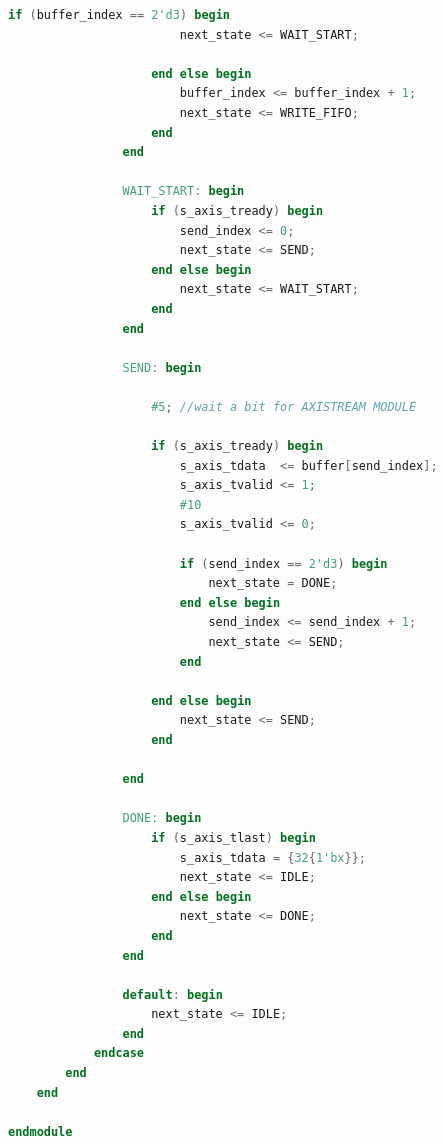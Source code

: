 \begin{adjustwidth}{1.5cm}{}
\begin{lstlisting}[language=verilog,frame=single,caption={Código fuente de la cola FIFO conversora a AXI-Stream},showstringspaces=false,label=lst:verilogFifo2axis]
                    if (buffer_index == 2'd3) begin
                        next_state <= WAIT_START;
                        
                    end else begin
                        buffer_index <= buffer_index + 1;
                        next_state <= WRITE_FIFO;
                    end
                end

                WAIT_START: begin
                    if (s_axis_tready) begin
                        send_index <= 0;
                        next_state <= SEND;
                    end else begin
                        next_state <= WAIT_START;
                    end
                end
                
                SEND: begin
                    
                    #5; //wait a bit for AXISTREAM MODULE
                    
                    if (s_axis_tready) begin
                        s_axis_tdata  <= buffer[send_index];
                        s_axis_tvalid <= 1;
                        #10
                        s_axis_tvalid <= 0;
                        
                        if (send_index == 2'd3) begin
                            next_state = DONE;
                        end else begin
                            send_index <= send_index + 1;
                            next_state <= SEND;
                        end

                    end else begin
                        next_state <= SEND;
                    end

                end
                
                DONE: begin
                    if (s_axis_tlast) begin
                        s_axis_tdata = {32{1'bx}};
                        next_state <= IDLE;
                    end else begin
                        next_state <= DONE;
                    end
                end
                
                default: begin
                    next_state <= IDLE;
                end
            endcase
        end
    end

endmodule
\end{lstlisting}


\end{adjustwidth}
